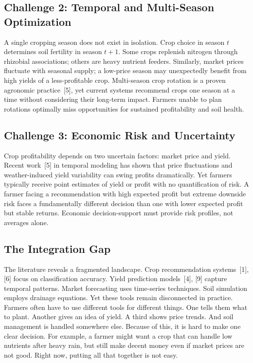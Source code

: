 \documentclass[conference]{IEEEtran}
\begin{document}
\subsection{Challenge 2: Temporal and Multi-Season Optimization}

A single cropping season does not exist in isolation. Crop choice in season
$t$ determines soil fertility in season $t+1$. Some crops replenish nitrogen
through rhizobial associations; others are heavy nutrient feeders. Similarly,
market prices fluctuate with seasonal supply; a low-price season may
unexpectedly benefit from high yields of a less-profitable crop. Multi-season
crop rotation is a proven agronomic practice~[5], yet current systems recommend
crops one season at a time without considering their long-term impact. Farmers
unable to plan rotations optimally miss opportunities for sustained
profitability and soil health.

\subsection{Challenge 3: Economic Risk and Uncertainty}

Crop profitability depends on two uncertain factors: market price and yield.
Recent work~[5] in temporal modeling has shown that price fluctuations and
weather-induced yield variability can swing profits dramatically. Yet farmers
typically receive point estimates of yield or profit with no quantification of
risk. A farmer facing a recommendation with high expected profit but extreme
downside risk faces a fundamentally different decision than one with lower
expected profit but stable returns. Economic decision-support must provide risk
profiles, not averages alone.

\subsection{The Integration Gap}

The literature reveals a fragmented landscape. Crop recommendation systems~[1],
[6] focus on classification accuracy. Yield prediction models~[4], [9] capture
temporal patterns. Market forecasting uses time-series techniques. Soil
simulation employs drainage equations. Yet these tools remain disconnected in
practice. Farmers often have to use different tools for different things. One
tells them what to plant. Another gives an idea of yield. A third shows price
trends. And soil management is handled somewhere else. Because of this, it is
hard to make one clear decision. For example, a farmer might want a crop that
can handle low nutrients after heavy rain, but still make decent money even if
market prices are not good. Right now, putting all that together is not easy.
\end{document}
